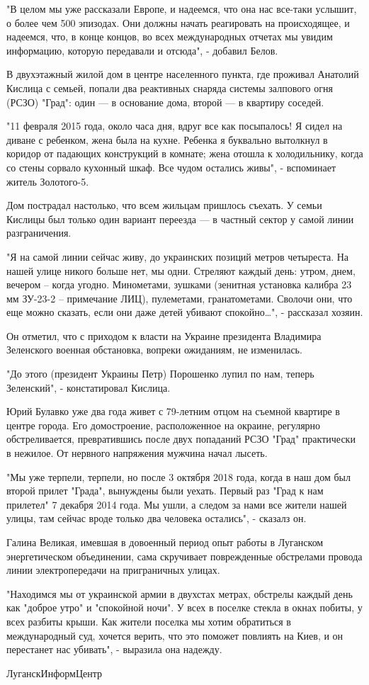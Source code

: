 "В целом мы уже рассказали Европе, и надеемся, что она нас все-таки услышит, о
более чем 500 эпизодах. Они должны начать реагировать на происходящее, и
надеемся, что, в конце концов, во всех международных отчетах мы увидим
информацию, которую передавали и отсюда", - добавил Белов. 

В двухэтажный жилой дом в центре населенного пункта, где проживал Анатолий
Кислица с семьей, попали два реактивных снаряда системы залпового огня (РСЗО)
"Град": один --- в основание дома, второй --- в квартиру соседей. 

"11 февраля 2015 года, около часа дня, вдруг все как посыпалось! Я сидел на
диване с ребенком, жена была на кухне. Ребенка я буквально вытолкнул в коридор
от падающих конструкций в комнате; жена отошла к холодильнику, когда со стены
сорвало кухонный шкаф. Все чудом остались живы", - вспоминает житель
Золотого-5. 

Дом пострадал настолько, что всем жильцам пришлось съехать. У семьи Кислицы был
только один вариант переезда --- в частный сектор у самой линии разграничения. 

"Я на самой линии сейчас живу, до украинских позиций метров четыреста. На нашей
улице никого больше нет, мы одни. Стреляют каждый день: утром, днем, вечером –
когда угодно. Минометами, зушками (зенитная установка калибра 23 мм ЗУ-23-2 –
примечание ЛИЦ), пулеметами, гранатометами. Сволочи они, что еще можно сказать,
если они даже детей убивают спокойно…", - рассказал хозяин. 

Он отметил, что с приходом к власти на Украине президента Владимира Зеленского
военная обстановка, вопреки ожиданиям, не изменилась. 

"До этого (президент Украины Петр) Порошенко лупил по нам, теперь Зеленский", -
констатировал Кислица. 

Юрий Булавко уже два года живет с 79-летним отцом на съемной квартире в центре
города. Его домостроение, расположенное на окраине, регулярно обстреливается,
превратившись после двух попаданий РСЗО "Град" практически в нежилое. От
нервного напряжения мужчина начал лысеть. 

"Мы уже терпели, терпели, но после 3 октября 2018 года, когда в наш дом был
второй прилет "Града", вынуждены были уехать. Первый раз "Град к нам прилетел"
7 декабря 2014 года. Мы ушли, а следом за нами все жители нашей улицы, там
сейчас вроде только два человека остались", - сказалз он. 

Галина Великая, имевшая в довоенный период опыт работы в Луганском
энергетическом объединении, сама скручивает поврежденные обстрелами провода
линии электропередачи на приграничных улицах. 

"Находимся мы от украинской армии в двухстах метрах, обстрелы каждый день как
"доброе утро" и "спокойной ночи". У всех в поселке стекла в окнах побиты, у
всех разбиты крыши. Как жители поселка мы хотим обратиться в международный суд,
хочется верить, что это поможет повлиять на Киев, и он перестанет нас убивать",
- выразила она надежду. 



ЛуганскИнформЦентр
  
